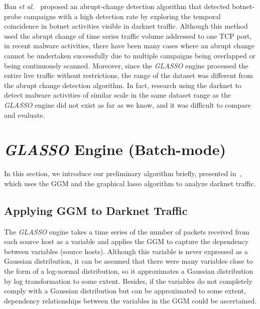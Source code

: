 \documentclass[conference]{IEEEtran}
\begin{document}
Ban \textit{et al.}~\cite{Ban} proposed an abrupt-change detection algorithm that detected botnet-probe campaigns with a high detection rate by exploring the temporal coincidence in botnet activities visible in darknet traffic.
Although this method used the abrupt change of time series traffic volume addressed to one TCP port, in recent malware activities, there have been many cases where an abrupt change cannot be undertaken successfully due to multiple campaigns being overlapped or being continuously scanned.
Moreover, since the \textit{GLASSO} engine processed the entire live traffic without restrictions, the range of the dataset was different from the abrupt change detection algorithm.
In fact, research using the darknet to detect malware activities of similar scale in the same dataset range as the \textit{GLASSO} engine did not exist as far as we know, and it was difficult to compare and evaluate.




\section{\textit{GLASSO} Engine (Batch-mode)}
In this section, we introduce our preliminary algorithm briefly, presented in~\cite{Han}, which uses the GGM and the graphical lasso algorithm to analyze darknet traffic.


\subsection{Applying GGM to Darknet Traffic}
\label{Data}
The \textit{GLASSO} engine takes a time series of the number of packets received from each source host as a variable and applies the GGM to capture the dependency between variables (source hosts).
Although this variable is never expressed as a Gaussian distribution, it can be assumed that there were many variables close to the form of a log-normal distribution, so it approximates a Gaussian distribution by log transformation to some extent.
Besides, if the variables do not completely comply with a Gaussian distribution but can be approximated to some extent, dependency relationships between the variables in the GGM could be ascertained.
\end{document}
